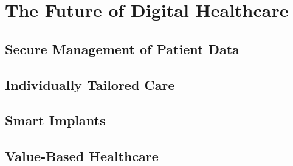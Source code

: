\section{The Future of Digital Healthcare}
\subsection{Secure Management of Patient Data}
\subsection{Individually Tailored Care}
\subsection{Smart Implants}
\subsection{Value-Based Healthcare}

